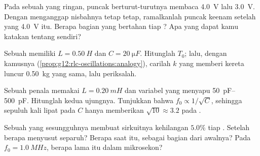 \begin{exercise}[$\star\star$]\label{exo:g12:rlc-oscillations:10}
Pada  sebuah  yang  ringan, puncak berturut-turutnya
membaca \qty{4.0}{V} lalu \qty{3.0}{V}. Dengan menganggap nisbahnya tetap
tetap, ramalkanlah puncak keenam setelah yang \qty{4.0}{V} itu. Berapa
bagian \emph{} yang bertahan tiap ? Apa yang dapat
kamu katakan tentang  sendiri?
\end{exercise}

\begin{exercise}[$\star\star$]\label{exo:g12:rlc-oscillations:11}
Sebuah  memiliki $L = \qty{0.50}{H}$ dan $C = \qty{20}{\micro F}$.
Hitunglah $T_0$; lalu, dengan kamusnya
(\cref{prop:g12:rlc-oscillations:analogy}), carilah  $k$
yang memberi kereta luncur \qty{0.50}{kg}  yang sama, lalu periksalah.
\end{exercise}

\begin{exercise}[$\star\star\star$]\label{exo:g12:rlc-oscillations:12}
Sebuah penala memakai $L = \qty{0.20}{mH}$ dan  variabel yang menyapu
\qtyrange{50}{500}{pF}. Hitunglah kedua  ujungnya. Tunjukkan bahwa
$f_0 \propto 1/\sqrt{C}$, sehingga sepuluh kali lipat pada $C$ hanya memberikan
$\sqrt{10} \approx 3.2$ pada .
\end{exercise}

\begin{exercise}[$\star\star\star$]\label{exo:g12:rlc-oscillations:13}
Sebuah  yang sesungguhnya membuat sirkuitnya kehilangan $5.0\%$  tiap
. Setelah berapa   menyusut separuh? Berapa
 saat itu, sebagai bagian dari awalnya? Pada
$f_0 = \qty{1.0}{MHz}$, berapa lama itu dalam mikrosekon?
\end{exercise}


